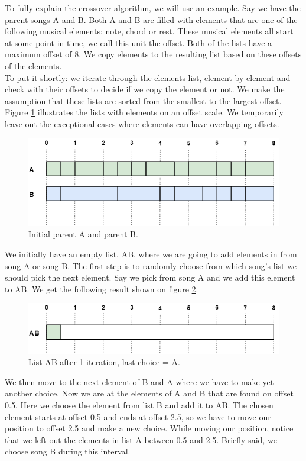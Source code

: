 \documentclass[a4paper]{article}
\begin{document}
To fully explain the crossover algorithm, we will use an example. Say we have the parent songs A and B. Both A and B are filled with elements that are one of the following musical elements: note, chord or rest. These musical elements all start at some point in time, we call this unit the offset. Both of the lists have a maximum offset of 8. We copy elements to the resulting list based on these offsets of the elements. 
\\
To put it shortly: we iterate through the elements list, element by element and check with their offsets to decide if we copy the element or not. We make the assumption that these lists are sorted from the smallest to the largest offset. Figure \ref{fig:cross_init} illustrates the lists with elements on an offset scale. We temporarily leave out the exceptional cases where elements can have overlapping offsets.
\begin{figure}[H]
	\includegraphics[width=\textwidth]{Fotos/crossover/init.png}
	\caption{Initial parent A and parent B.}
	\label{fig:cross_init}
\end{figure}

We initially have an empty list, AB, where we are going to add elements in from song A or song B. The first step is to randomly choose from which song's list we should pick the next element. Say we pick from song A and we add this element to AB. We get the following result shown on figure \ref{fig:cross_1}. 

\begin{figure}[H]
	\includegraphics[width=\textwidth]{Fotos/crossover/first.png}
	\caption{List AB after 1 iteration, last choice = A.}
	\label{fig:cross_1}
\end{figure}

We then move to the next element of B and A where we have to make yet another choice. Now we are at the elements of A and B that are found on offset 0.5. Here we choose the element from list B and add it to AB. The chosen element starts at offset 0.5 and ends at offset 2.5, so we have to move our position to offset 2.5 and make a new choice. While moving our position, notice that we left out the elements in list A between 0.5 and 2.5. Briefly said, we choose song B during this interval.
\end{document}
